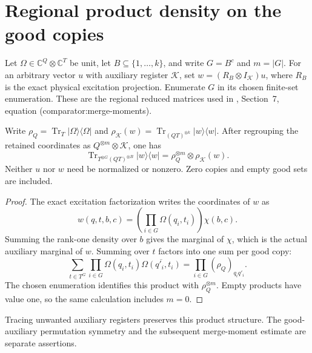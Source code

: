 \section{Regional product density on the good copies}
\label{sec:replica_regional_density}

Let \(\Omega\in\mathbb C^Q\otimes\mathbb C^T\) be unit, let
\(B\subseteq\{1,\ldots,k\}\), and write \(G=B^c\) and \(m=|G|\).
For an arbitrary vector \(u\) with auxiliary register \(\mathcal K\), set
\(w=(R_B\otimes I_{\mathcal K})u\), where \(R_B\) is the exact physical
excitation projection. Enumerate \(G\) in its chosen finite-set enumeration.
These are the regional reduced matrices used in \cite{OpenAI2026AreaLaw},
Section~7, equation (comparator:merge-moments).

\begin{theorem}
\label{thm:replica_regional_product_density}
\leanok
{}
Write \(\rho_Q=\operatorname{Tr}_T|\Omega\rangle\langle\Omega|\) and
\(\rho_{\mathcal K}(w)=\operatorname{Tr}_{(QT)^{\otimes k}}
|w\rangle\langle w|\). After regrouping the retained coordinates as
\(Q^{\otimes m}\otimes\mathcal K\), one has
\[
 \operatorname{Tr}_{T^{\otimes G}(QT)^{\otimes B}}
 |w\rangle\langle w|
 =\rho_Q^{\otimes m}\otimes\rho_{\mathcal K}(w).
\]
Neither \(u\) nor \(w\) need be normalized or nonzero. Zero copies and
empty good sets are included.
\end{theorem}

\begin{proof}
\leanok
{}
The exact excitation factorization writes the coordinates of \(w\) as
\[
 w(q,t,b,c)=\left(\prod_{i\in G}\Omega(q_i,t_i)\right)\chi(b,c).
\]
Summing the rank-one density over \(b\) gives the marginal of \(\chi\),
which is the actual auxiliary marginal of \(w\). Summing over \(t\)
factors into one sum per good copy:
\[
 \sum_{t\in T^G}\prod_{i\in G}
 \Omega(q_i,t_i)\overline{\Omega(q'_i,t_i)}
 =\prod_{i\in G}(\rho_Q)_{q_iq'_i}.
\]
The chosen enumeration identifies this product with
\(\rho_Q^{\otimes m}\). Empty products have value one, so the same
calculation includes \(m=0\).
\end{proof}

Tracing unwanted auxiliary registers preserves this product structure.
The good-auxiliary permutation symmetry and the subsequent merge-moment
estimate are separate assertions.
